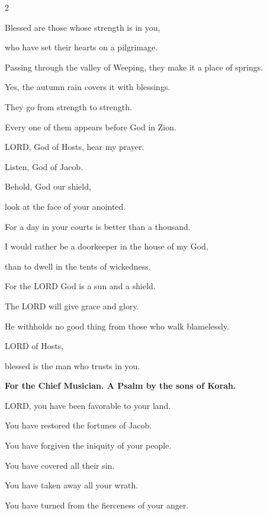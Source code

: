\begin{multicols}{2}
	\vspace{\baselineskip}
	
	
	\myverse{}Blessed are those whose strength is in you,
	
	who have set their hearts on a pilgrimage.
	
	
	\myverse{}Passing through the valley of Weeping, they make it a place of
	springs.
	
	Yes, the autumn rain covers it with blessings.
	
	
	\myverse{}They go from strength to strength.
	
	Every one of them appears before God in Zion.
	
	
	\myverse{}LORD, God of Hosts, hear my prayer.
	
	Listen, God of Jacob.
	
	\vspace{\baselineskip}
	
	
	\myverse{}Behold, God our shield,
	
	look at the face of your anointed.
	
	
	\myverse{}For a day in your courts is better than a thousand.
	
	I would rather be a doorkeeper in the house of my God,
	
	than to dwell in the tents of wickedness.
	
	
	\myverse{}For the LORD God is a sun and a shield.
	
	The LORD will give grace and glory.
	
	He withholds no good thing from those who walk blamelessly.
	
	
	\myverse{}LORD of Hosts,
	
	blessed is the man who trusts in you.
	
	
	\mychapter{}\textbf{For the Chief Musician. A Psalm by the sons of Korah.}
	
	\myverse*{}LORD, you have been favorable to your land.
	
	You have restored the fortunes of Jacob.
	
	
	\myverse{}You have forgiven the iniquity of your people.
	
	You have covered all their sin.
	
	\vspace{\baselineskip}
	
	
	\myverse{}You have taken away all your wrath.
	
	You have turned from the fierceness of your anger.
	

\end{multicols}
